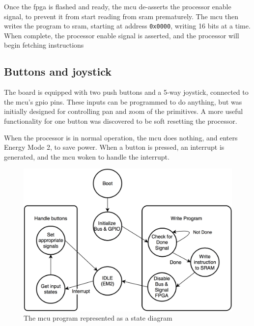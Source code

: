 Once the \gls{fpga} is flashed and ready, the \gls{mcu} de-asserts the processor enable signal, to prevent it from start reading from \gls{sram} prematurely.
The \gls{mcu} then writes the program to \gls{sram}, starting at address \texttt{0x0000}, writing 16 bits at a time.
When complete, the processor enable signal is asserted, and the processor will begin fetching instructions

\subsection{Buttons and joystick}
The board is equipped with two push buttons and a 5-way joystick, connected to the \gls{mcu}'s \gls{gpio} pins.
These inputs can be programmed to do anything, but was initially designed for controlling pan and zoom of the primitives.
A more useful functionality for one button was discovered to be soft resetting the processor.

When the processor is in normal operation, the \gls{mcu} does nothing, and enters Energy Mode 2, to save power.
When a button is pressed, an interrupt is generated, and the \gls{mcu} woken to handle the interrupt.

\begin{figure}[h!]
\centering \includegraphics[width = 0.75\linewidth]{images/MCU_state.png}
\caption{The \gls{mcu} program represented as a state diagram}
\label{fig:mcu_state}
\end{figure}
